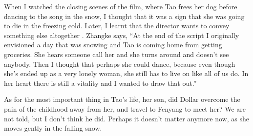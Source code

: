 \documentclass{article}
\begin{document}
When I watched the closing scenes of the film, where Tao frees her dog
before dancing to the song in the snow, I thought that it was a sign
that she was going to die in the freezing cold.  Later, I learnt that
the director wants to convey something else altogether
\parencite{bib:6xz64ynw}.  Zhangke says, ``At the end of the script I
originally envisioned a day that was snowing and Tao is coming home
from getting groceries.  She hears someone call her and she turns
around and doesn’t see anybody.  Then I thought that perhaps she could
dance, because even though she’s ended up as a very lonely woman, she
still has to live on like all of us do.  In her heart there is still a
vitality and I wanted to draw that out.''

As for the most important thing in Tao's life, her son, did Dollar
overcome the pain of the childhood away from her, and travel to
Fenyang to meet her? We are not told, but I don't think he did.
Perhaps it doesn't matter anymore now, as she moves gently in the
falling snow.

\bibsection
\end{document}
